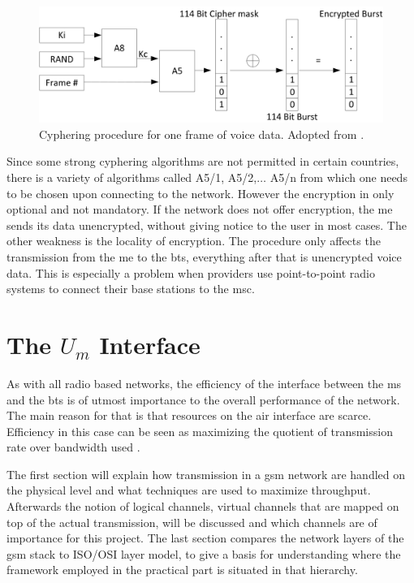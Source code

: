 \begin{figure}
\centering
\includegraphics{../Images/Cipher}
\caption{Cyphering procedure for one frame of voice data. Adopted from \cite{kommsys2006}.}
\label{fig:cypher}
\end{figure}

Since some strong cyphering algorithms are not permitted in certain countries, there is a variety of algorithms called A5/1, A5/2,$\ldots$ A5/n from which one needs to be chosen upon connecting to the network.
However the encryption in only optional and not mandatory.
If the network does not offer encryption, the \gls{me} sends its data unencrypted, without giving notice to the user in most cases.
The other weakness is the locality of encryption.
The procedure only affects the transmission from the \gls{me} to the \gls{bts}, everything after that is unencrypted voice data.
This is especially a problem when providers use point-to-point radio systems to connect their base stations to the \gls{msc}.

\section{The $U_m$ Interface}
\label{sec:Um}
As with all radio based networks, the efficiency of the interface between the \gls{ms} and the \gls{bts} is of utmost importance to the overall performance of the network.
The main reason for that is that resources on the air interface are scarce.
Efficiency in this case can be seen as maximizing the quotient of transmission rate over bandwidth used \cite{protocols1999}.

The first section will explain how transmission in a \gls{gsm} network are handled on the physical level and what techniques are used to maximize throughput.
Afterwards the notion of logical channels, virtual channels that are mapped on top of the actual transmission, will be discussed and which channels are of importance for this project.
The last section compares the network layers of the \gls{gsm} stack to ISO/OSI layer model, to give a basis for understanding where the framework employed in the practical part is situated in that hierarchy.

